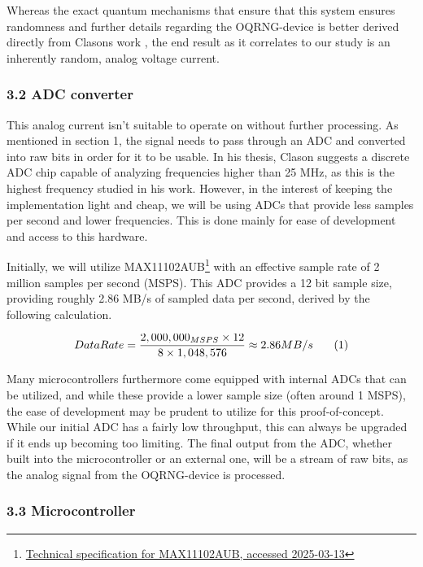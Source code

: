 Whereas the exact quantum mechanisms that ensure that this system ensures randomness and further details regarding the OQRNG-device is better derived directly from Clasons work \cite{Clason2023}, the end result as it correlates to our study is an inherently random, analog voltage current.

\subsubsection{3.2 ADC converter}\label{adc-converter}

This analog current isn't suitable to operate on without further processing. As mentioned in section 1, the signal needs to pass through an ADC and converted into raw bits in order for it to be usable. In his thesis, Clason \cite{Clason2023} suggests a discrete ADC chip capable of analyzing frequencies higher than 25 MHz, as this is the highest frequency studied in his work. However, in the interest of keeping the implementation light and cheap, we will be using ADCs that provide less samples per second and lower frequencies. This is done mainly for ease of development and access to this hardware.

Initially, we will utilize MAX11102AUB\footnote{\href{https://www.farnell.com/datasheets/1913106.pdf}{Technical specification for MAX11102AUB, accessed 2025-03-13}} with an effective sample rate of 2 million samples per second (MSPS). This ADC provides a 12 bit sample size, providing roughly 2.86 MB/s of sampled data per second, derived by the following calculation.

\[
Data Rate = \frac{2,000,000_{MSPS} \times 12}{8 \times 1,048,576} \approx 2.86 MB/s \text{\phantom{123} (1)}
\]

Many microcontrollers furthermore come equipped with internal ADCs that can be utilized, and while these provide a lower sample size (often around 1 MSPS), the ease of development may be prudent to utilize for this proof-of-concept. While our initial ADC has a fairly low throughput, this can always be upgraded if it ends up becoming too limiting. The final output from the ADC, whether built into the microcontroller or an external one, will be a stream of raw bits, as the analog signal from the OQRNG-device is processed.

\subsubsection{3.3 Microcontroller}\label{microcontroller}

